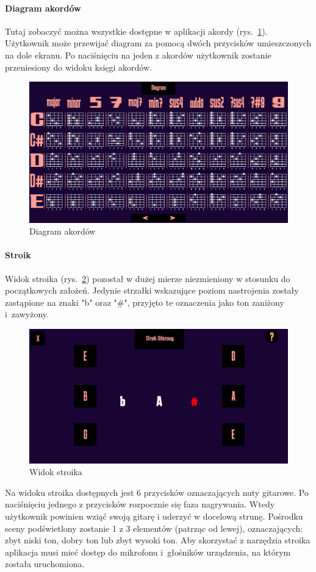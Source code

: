 \paragraph{Diagram akordów}
Tutaj zobaczyć można wszystkie dostępne w aplikacji akordy (rys.~\ref{fig:DiagramAk}). Użytkownik może przewijać diagram za pomocą dwóch przycisków umieszczonych na dole ekranu. Po naciśnięciu na jeden z akordów użytkownik zostanie przeniesiony do widoku księgi akordów.
\begin{figure}[htb]
	\centering
	\includegraphics[width=.6\linewidth]{rysB/Diagram}
	\caption{Diagram akordów} \label{fig:DiagramAk}
\end{figure}

\paragraph{Stroik}
Widok stroika (rys.~\ref{fig:Stroik}) pozostał w dużej mierze niezmieniony w stosunku do początkowych założeń. Jedynie strzałki wskazujące poziom nastrojenia zostały zastąpione na znaki "b" oraz "\#", przyjęto te oznaczenia jako ton zaniżony i~zawyżony.
\begin{figure}[htb]
	\centering
	\includegraphics[width=.6\linewidth]{rysB/Stroik}
	\caption{Widok stroika} \label{fig:Stroik}
\end{figure}

Na widoku stroika dostępnych jest 6 przycisków oznaczających nuty gitarowe. Po naciśnięciu jednego z przycisków rozpocznie się faza nagrywania. Wtedy użytkownik powinien wziąć swoją gitarę i uderzyć w docelową strunę. Pośrodku sceny podświetlony zostanie 1 z 3 elementów (patrząc od lewej), oznaczających: zbyt niski ton, dobry ton lub zbyt wysoki ton. Aby skorzystać z narzędzia stroika aplikacja musi mieć dostęp do mikrofonu i~głośników urządzenia, na którym została uruchomiona.


